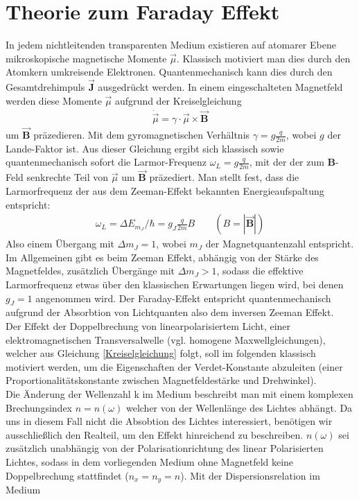 \documentclass[12pt,a4paper]{article}
\begin{document}
 \section{Theorie zum Faraday Effekt}
In jedem nichtleitenden transparenten Medium existieren auf atomarer Ebene mikroskopische magnetische Momente $\vec{\mu}$. Klassisch motiviert man dies durch den Atomkern umkreisende Elektronen. Quantenmechanisch kann dies durch den Gesamtdrehimpuls $\vec{\textbf{J}}$ ausgedrückt werden. In einem eingeschalteten Magnetfeld werden diese Momente $\vec{\mu}$ aufgrund der Kreiselgleichung
\begin{align}
\dot{\vec{\mu}} = \gamma\cdot\vec{\mu}\times\vec{\textbf{B}}
\label{Kreiselgleichung}
\end{align}
um $\vec{\textbf{B}}$ präzedieren. Mit dem gyromagnetischen Verhältnis $\gamma = g\frac{q}{2m}$, wobei $g$ der Lande-Faktor ist.
Aus dieser Gleichung ergibt sich klassisch sowie quantenmechanisch sofort die Larmor-Frequenz $\omega_L = g\frac{q}{2m}$, mit der der zum \textbf{B}-Feld senkrechte Teil von $\vec{\mu}$ um $\vec{\textbf{B}}$ präzediert. Man stellt fest, dass die Larmorfrequenz der aus dem Zeeman-Effekt bekannten Energieaufspaltung entspricht: 
\begin{align}
\omega_L = \Delta E_{m_J}/ \hbar = g_J\frac{q}{2m}B \qquad (B = |\vec{\textbf{B}}|)
\label{Larmorfrequenz}
\end{align}
Also einem Übergang mit $\Delta m_J = 1$, wobei $m_J$ der Magnetquantenzahl entspricht.\\
Im Allgemeinen gibt es beim Zeeman Effekt, abhängig von der Stärke des Magnetfeldes, zusätzlich Übergänge mit $\Delta m_J > 1$, sodass die effektive Larmorfrequenz etwas über den klassischen Erwartungen liegen wird, bei denen $g_J=1$ angenommen wird. Der Faraday-Effekt entspricht quantenmechanisch aufgrund der Absorbtion von Lichtquanten also dem inversen Zeeman Effekt.\\
Der Effekt der Doppelbrechung von linearpolarisiertem Licht, einer elektromagnetischen Transversalwelle (vgl. homogene Maxwellgleichungen), welcher aus Gleichung \ref{Kreiselgleichung} folgt, soll im folgenden klassisch motiviert werden, um die Eigenschaften der Verdet-Konstante abzuleiten (einer Proportionalitätskonstante zwischen Magnetfeldestärke und Drehwinkel).\\
Die Änderung der Wellenzahl k im Medium beschreibt man mit einem komplexen Brechungsindex $n = n(\omega)$ welcher von der Wellenlänge des Lichtes abhängt. Da uns in diesem Fall nicht die Absobtion des Lichtes interessiert, benötigen wir ausschließlich den Realteil, um den Effekt hinreichend zu beschreiben. $n(\omega)$ sei zusätzlich unabhängig von der Polarisationrichtung des linear Polarisierten Lichtes, sodass in dem vorliegenden Medium ohne Magnetfeld keine Doppelbrechung stattfindet ($n_x = n_y = n$). Mit der Dispersionsrelation im Medium
\end{document}
